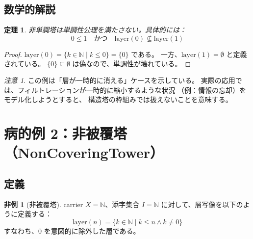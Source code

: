 \documentclass[a4paper,11pt]{ltjsarticle}
\theoremstyle{definition}
\newtheorem{nonexample}[definition]{非例}
\theoremstyle{plain}
\newtheorem{theorem}[definition]{定理}
\theoremstyle{remark}
\newtheorem{remark}[definition]{注意}
\newcommand{\N}{\mathbb{N}}
\newcommand{\Layer}{\mathrm{layer}}
\begin{document}
\subsection{数学的解説}

\begin{theorem}
非単調塔は単調性公理を満たさない。具体的には：
\[
    0 \leq 1 \quad \text{かつ} \quad \Layer(0) \not\subseteq \Layer(1)
\]
\end{theorem}

\begin{proof}
$\Layer(0) = \{k \in \N \mid k \leq 0\} = \{0\}$ である。
一方、$\Layer(1) = \emptyset$ と定義されている。
$\{0\} \subseteq \emptyset$ は偽なので、単調性が壊れている。
\end{proof}

\begin{remark}
この例は「層が一時的に消える」ケースを示している。
実際の応用では、フィルトレーションが一時的に縮小するような状況
（例：情報の忘却）をモデル化しようとすると、
構造塔の枠組みでは扱えないことを意味する。
\end{remark}

\section{病的例 2：非被覆塔（NonCoveringTower）}

\subsection{定義}

\begin{nonexample}[非被覆塔]
carrier $X = \N$、添字集合 $I = \N$ に対して、層写像を以下のように定義する：
\[
    \Layer(n) = \{k \in \N \mid k \leq n \land k \neq 0\}
\]
すなわち、$0$ を意図的に除外した層である。
\end{nonexample}
\end{document}
